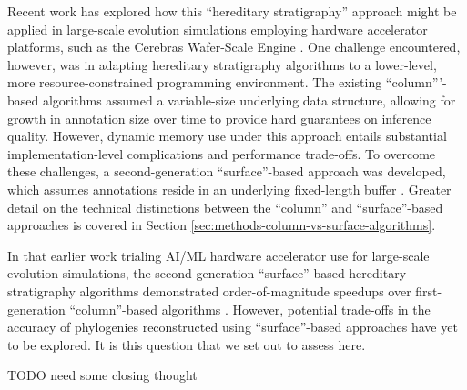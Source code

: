 Recent work has explored how this ``hereditary stratigraphy'' approach might be applied in large-scale evolution simulations employing hardware accelerator platforms, such as the Cerebras Wafer-Scale Engine \citep{moreno2024trackable}.
One challenge encountered, however, was in adapting hereditary stratigraphy algorithms to a lower-level, more resource-constrained programming environment.
The existing ``column'''-based algorithms assumed a variable-size underlying data structure, allowing for growth in annotation size over time to provide hard guarantees on inference quality.
However, dynamic memory use under this approach entails substantial implementation-level complications and performance trade-offs.
To overcome these challenges, a second-generation ``surface''-based approach was developed, which assumes annotations reside in an underlying fixed-length buffer \citep{moreno2024algorithms}.
Greater detail on the technical distinctions between the ``column'' and ``surface''-based approaches is covered in Section \ref{sec:methods-column-vs-surface-algorithms}.

In that earlier work trialing AI/ML hardware accelerator use for large-scale evolution simulations, the second-generation ``surface''-based hereditary stratigraphy algorithms demonstrated order-of-magnitude speedups over first-generation ``column''-based algorithms \citep{moreno2024trackable}.
However, potential trade-offs in the accuracy of phylogenies reconstructed using ``surface''-based approaches have yet to be explored.
It is this question that we set out to assess here.

TODO need some closing thought

